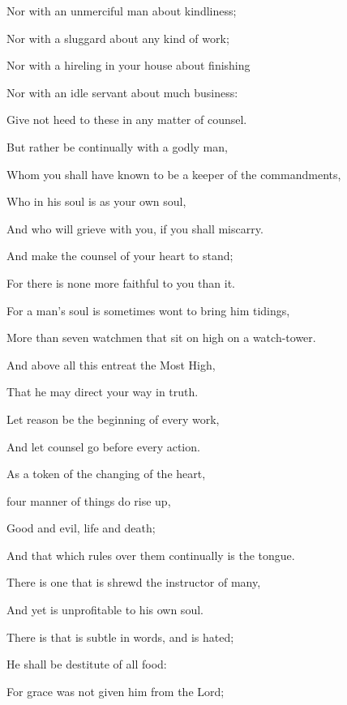 {\par }{\Q Nor with an unmerciful man about kindliness;
\par }{\Q Nor with a sluggard about any kind of work;
\par }{\Q Nor with a hireling in your house about finishing
{}
\par }{\Q Nor with an idle servant about much business:
\par }{\Q Give not heed to these in any matter of counsel.
\par }{\Q {}But rather be continually with a godly man,
\par }{\Q Whom you shall have known to be a keeper of the commandments,
\par }{\Q Who in his soul is as your own soul,
\par }{\Q And who will grieve with you, if you shall miscarry.
\par }{\Q {}And make the counsel of your heart to stand;
\par }{\Q For there is none more faithful to you than it.
\par }{\Q {}For a man’s soul is sometimes wont to bring him tidings,
\par }{\Q More than seven watchmen that sit on high on a watch-tower.
\par }{\Q {}And above all this entreat the Most High,
\par }{\Q That he may direct your way in truth.
\par }{\BB \par }{\Q {}Let reason be the beginning of every work,
\par }{\Q And let counsel go before every action.
\par }{\Q {}As a token of the changing of the heart,
\par }{\Q {}four manner of things do rise up,
\par }{\Q Good and evil, life and death;
\par }{\Q And that which rules over them continually is the tongue.
\par }{\Q {}There is one that is shrewd
{} the instructor of many,
\par }{\Q And yet is unprofitable to his own soul.
\par }{\Q {}There is
{} that is subtle in words, and is hated;
\par }{\Q He shall be destitute of all food:
\par }{\Q {}For grace was not given him from the Lord;
}
